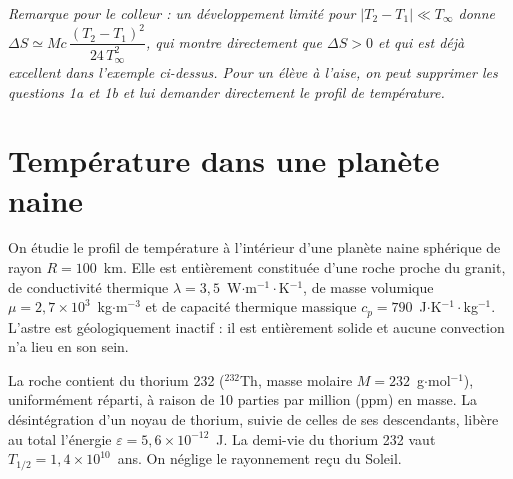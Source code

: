 \begin{correction}
\begin{enumerate}
\begin{enumerate}
	\textit{Remarque pour le colleur : un développement limité pour $|T_2-T_1|\ll T_\infty$ donne $\Delta S\simeq Mc\,\dfrac{(T_2-T_1)^2}{24\,T_\infty^2}$, qui montre directement que $\Delta S>0$ et qui est déjà excellent dans l'exemple ci-dessus. Pour un élève à l'aise, on peut supprimer les questions 1a et 1b et lui demander directement le profil de température.}

\end{enumerate}

\end{enumerate}

\end{correction}

\newpage

\section{Température dans une planète naine}

On étudie le profil de température à l'intérieur d'une planète naine sphérique de rayon $R=100$~km. Elle est entièrement constituée d'une roche proche du granit, de conductivité thermique $\lambda = 3{,}5$~W$\cdot$m$^{-1}\cdot$K$^{-1}$, de masse volumique $\mu=2{,}7\times10^{3}$~kg$\cdot$m$^{-3}$ et de capacité thermique massique $c_p=790$~J$\cdot$K$^{-1}\cdot$kg$^{-1}$. L'astre est géologiquement inactif : il est entièrement solide et aucune convection n'a lieu en son sein.

La roche contient du thorium 232 ($^{232}$Th, masse molaire $M=232$~g$\cdot$mol$^{-1}$), uniformément réparti, à raison de 10 parties par million (ppm) en masse. La désintégration d'un noyau de thorium, suivie de celles de ses descendants, libère au total l'énergie $\varepsilon=5{,}6\times10^{-12}$~J. La demi-vie du thorium 232 vaut $T_{1/2}=1{,}4\times10^{10}$~ans. On néglige le rayonnement reçu du Soleil.

